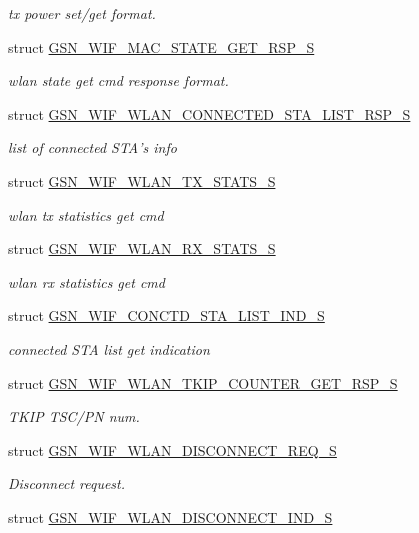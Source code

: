 \begin{DoxyCompactItemize}
\begin{DoxyCompactList}\small\item\em tx power set/get format. \end{DoxyCompactList}\item 
struct \hyperlink{a00341}{GSN\_\-WIF\_\-MAC\_\-STATE\_\-GET\_\-RSP\_\-S}
\begin{DoxyCompactList}\small\item\em wlan state get cmd response format. \end{DoxyCompactList}\item 
struct \hyperlink{a00375}{GSN\_\-WIF\_\-WLAN\_\-CONNECTED\_\-STA\_\-LIST\_\-RSP\_\-S}
\begin{DoxyCompactList}\small\item\em list of connected STA's info \end{DoxyCompactList}\item 
struct \hyperlink{a00410}{GSN\_\-WIF\_\-WLAN\_\-TX\_\-STATS\_\-S}
\begin{DoxyCompactList}\small\item\em wlan tx statistics get cmd \end{DoxyCompactList}\item 
struct \hyperlink{a00398}{GSN\_\-WIF\_\-WLAN\_\-RX\_\-STATS\_\-S}
\begin{DoxyCompactList}\small\item\em wlan rx statistics get cmd \end{DoxyCompactList}\item 
struct \hyperlink{a00321}{GSN\_\-WIF\_\-CONCTD\_\-STA\_\-LIST\_\-IND\_\-S}
\begin{DoxyCompactList}\small\item\em connected STA list get indication \end{DoxyCompactList}\item 
struct \hyperlink{a00407}{GSN\_\-WIF\_\-WLAN\_\-TKIP\_\-COUNTER\_\-GET\_\-RSP\_\-S}
\begin{DoxyCompactList}\small\item\em TKIP TSC/PN num. \end{DoxyCompactList}\item 
struct \hyperlink{a00380}{GSN\_\-WIF\_\-WLAN\_\-DISCONNECT\_\-REQ\_\-S}
\begin{DoxyCompactList}\small\item\em Disconnect request. \end{DoxyCompactList}\item 
struct \hyperlink{a00379}{GSN\_\-WIF\_\-WLAN\_\-DISCONNECT\_\-IND\_\-S}

\end{DoxyCompactItemize}

